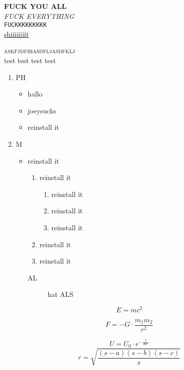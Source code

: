 \documentclass[ngerman]{scrartcl}
\begin{document}
\textbf{FUCK YOU ALL}
\\
\textit{FUCK EVERYTHING}
\\
\texttt{FUCKKKKKKKKK}
\\
\underline{shiiiiiiiit}


\textsc{askfjdfihasdfljasdfklj}
\\
{\tiny test}
{\small test}
{\huge test}
{\large test}

\begin{enumerate}
	\item PH
	\begin{itemize}
			\item hallo
			\item joeysucks
			\item reinstall it
	\end{itemize}
	\item M
	\begin{itemize}
			\item reinstall it
			\begin{enumerate}
				\item reinstall it
				\begin{enumerate}
					\item reinstall it
					\item reinstall it
					\item reinstall it
				\end{enumerate}

				\item reinstall it
				\item reinstall it
			\end{enumerate}
	\begin{description}
		\item[AL] hat ALS
	\end{description}
	\end{itemize}
\end{enumerate}
			
\begin{equation}
	 E =  m c^2
\end{equation}

\begin{equation}
	 F = - G \cdot \frac{m_1 m_2 }{r^2}
	 \label{formula1}
\end{equation}

\begin{equation}
	U = U_0 \cdot e^{-\frac{t}{RC}}
\end{equation}
\begin{equation}
	r = \sqrt{\frac{(s-a)(s-b)(s-c)}{s}}
\end{equation}
\end{document}
